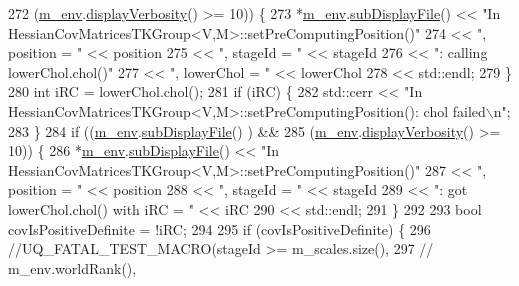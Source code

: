 \begin{DoxyCode}
272         (\hyperlink{class_q_u_e_s_o_1_1_base_t_k_group_a2bce5e8aa5c844d4332a0e73cf00a1f9}{m\_env}.\hyperlink{class_q_u_e_s_o_1_1_base_environment_a1fe5f244fc0316a0ab3e37463f108b96}{displayVerbosity}() >= 10)) \{
273       *\hyperlink{class_q_u_e_s_o_1_1_base_t_k_group_a2bce5e8aa5c844d4332a0e73cf00a1f9}{m\_env}.\hyperlink{class_q_u_e_s_o_1_1_base_environment_a8a0064746ae8dddfece4229b9ad374d6}{subDisplayFile}() << \textcolor{stringliteral}{"In
       HessianCovMatricesTKGroup<V,M>::setPreComputingPosition()"}
274                               << \textcolor{stringliteral}{", position = "}  << position
275                               << \textcolor{stringliteral}{", stageId = "}   << stageId
276                               << \textcolor{stringliteral}{": calling lowerChol.chol()"}
277                               << \textcolor{stringliteral}{", lowerChol = "} << lowerChol
278                               << std::endl;
279     \}
280     \textcolor{keywordtype}{int} iRC = lowerChol.chol();
281     \textcolor{keywordflow}{if} (iRC) \{
282       std::cerr << \textcolor{stringliteral}{"In HessianCovMatricesTKGroup<V,M>::setPreComputingPosition(): chol failed\(\backslash\)n"};
283     \}
284     \textcolor{keywordflow}{if} ((\hyperlink{class_q_u_e_s_o_1_1_base_t_k_group_a2bce5e8aa5c844d4332a0e73cf00a1f9}{m\_env}.\hyperlink{class_q_u_e_s_o_1_1_base_environment_a8a0064746ae8dddfece4229b9ad374d6}{subDisplayFile}()        ) &&
285         (\hyperlink{class_q_u_e_s_o_1_1_base_t_k_group_a2bce5e8aa5c844d4332a0e73cf00a1f9}{m\_env}.\hyperlink{class_q_u_e_s_o_1_1_base_environment_a1fe5f244fc0316a0ab3e37463f108b96}{displayVerbosity}() >= 10)) \{
286       *\hyperlink{class_q_u_e_s_o_1_1_base_t_k_group_a2bce5e8aa5c844d4332a0e73cf00a1f9}{m\_env}.\hyperlink{class_q_u_e_s_o_1_1_base_environment_a8a0064746ae8dddfece4229b9ad374d6}{subDisplayFile}() << \textcolor{stringliteral}{"In
       HessianCovMatricesTKGroup<V,M>::setPreComputingPosition()"}
287                               << \textcolor{stringliteral}{", position = "}  << position
288                               << \textcolor{stringliteral}{", stageId = "}   << stageId
289                               << \textcolor{stringliteral}{": got lowerChol.chol() with iRC = "} << iRC
290                               << std::endl;
291     \}
292 
293     \textcolor{keywordtype}{bool} covIsPositiveDefinite = !iRC;
294 
295     \textcolor{keywordflow}{if} (covIsPositiveDefinite) \{
296       \textcolor{comment}{//UQ\_FATAL\_TEST\_MACRO(stageId >= m\_scales.size(),}
297       \textcolor{comment}{//                    m\_env.worldRank(),}

\end{DoxyCode}
